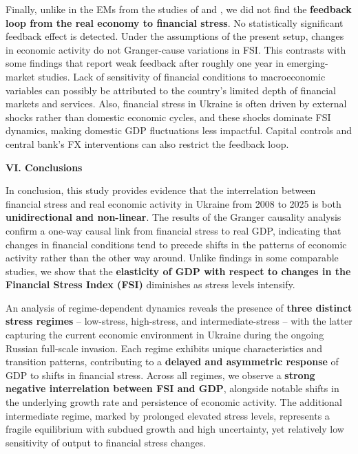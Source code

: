 \documentclass[12pt,preprint,aps,author-year]{revtex4-1}
\begin{document}
Finally, unlike in the EMs from the studies of \cite{ahir2023} and \cite{sahoo2020}, we did not find the \textbf{feedback loop from the real economy to financial stress}. No statistically significant feedback effect is detected. Under the assumptions of the present setup, changes in economic activity do not Granger-cause variations in FSI. This contrasts with some \cite{ahir2023} findings that report weak feedback after roughly one year in emerging-market studies. Lack of sensitivity of financial conditions to macroeconomic variables can possibly be attributed to the country’s limited depth of financial markets and services. Also, financial stress in Ukraine is often driven by external shocks rather than domestic economic cycles, and these shocks dominate FSI dynamics, making domestic GDP fluctuations less impactful. Capital controls and central bank’s FX interventions can also restrict the feedback loop.

\textbf{VI. Conclusions}

In conclusion, this study provides evidence that the interrelation between financial stress and real economic activity in Ukraine from 2008 to 2025 is both \textbf{unidirectional and non-linear}. The results of the Granger causality analysis confirm a one-way causal link from financial stress to real GDP, indicating that changes in financial conditions tend to precede shifts in the patterns of economic activity rather than the other way around. Unlike findings in some comparable studies, we show that the \textbf{elasticity of GDP with respect to changes in the Financial Stress Index (FSI)} diminishes as stress levels intensify.

An analysis of regime-dependent dynamics reveals the presence of \textbf{three distinct stress regimes} – low-stress, high-stress, and intermediate-stress – with the latter capturing the current economic environment in Ukraine during the ongoing Russian full-scale invasion. Each regime exhibits unique characteristics and transition patterns, contributing to a \textbf{delayed and asymmetric response} of GDP to shifts in financial stress. Across all regimes, we observe a \textbf{strong negative interrelation between FSI and GDP}, alongside notable shifts in the underlying growth rate and persistence of economic activity. The additional intermediate regime, marked by prolonged elevated stress levels, represents a fragile equilibrium with subdued growth and high uncertainty, yet relatively low sensitivity of output to financial stress changes.
\end{document}
